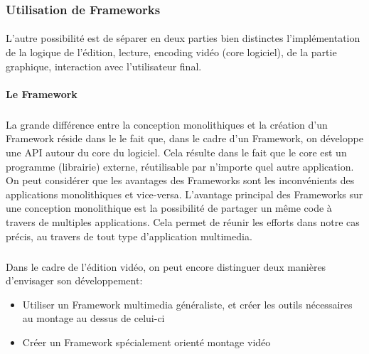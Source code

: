 \subsubsection {Utilisation de  Frameworks }

\paragraph{}

L'autre possibilité est de séparer en deux parties bien distinctes
l'implémentation de la logique de l'édition, lecture, encoding vidéo
(core logiciel), de la partie graphique, interaction avec l'utilisateur
final.

\newpage\paragraph {Le Framework}

\subparagraph{}

La grande différence entre la conception monolithiques
 et la création d'un Framework 
réside dans le le fait que, dans le cadre d'un Framework, on développe
une API  autour du core du logiciel. Cela résulte dans le
fait que le core est un programme (librairie) externe, réutilisable par
n'importe quel autre application.  On peut considérer que les avantages
des Frameworks sont les inconvénients des applications monolithiques
 et vice-versa. L'avantage principal des Frameworks
sur une conception monolithique est la possibilité
de partager un même code à travers de multiples applications. Cela
permet de réunir les efforts dans notre cas précis, au travers de tout
type d'application multimedia.

\subparagraph{}

Dans le cadre de l'édition vidéo, on peut encore distinguer deux
manières d'envisager son développement:

\begin {itemize}

  \item {Utiliser un Framework multimedia généraliste, et créer les
  outils nécessaires au montage au dessus de celui-ci}

  \item {Créer un Framework spécialement orienté montage vidéo}

\end {itemize}

